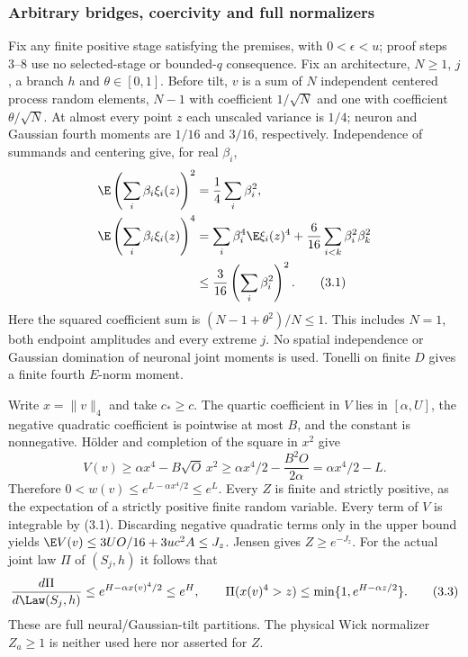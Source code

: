 \subsubsection{Arbitrary bridges, coercivity and full normalizers}
Fix any finite positive stage satisfying the premises, with $0<\epsilon<u$;
proof steps 3--8 use no selected-stage or bounded-$q$ consequence.
Fix an architecture, $N\ge1$, $j$, a branch $h$ and $\theta\in[0,1]$.
Before tilt, $v$ is a sum of $N$ independent centered process random
elements, $N-1$ with coefficient $1/\sqrt N$ and one with coefficient
$\theta/\sqrt N$. At almost every point $z$ each unscaled variance is
$1/4$; neuron and Gaussian fourth moments are $1/16$ and $3/16$,
respectively. Independence of summands and centering give, for real $\beta_i$,
\begin{align}
 \E\left(\sum_i\beta_i\xi_i(z)\right)^2&=\frac14\sum_i\beta_i^2,\notag\\
 \E\left(\sum_i\beta_i\xi_i(z)\right)^4
 &=\sum_i\beta_i^4\E\xi_i(z)^4
          +\frac6{16}\sum_{i<k}\beta_i^2\beta_k^2\notag\\
 &\le\frac3{16}\left(\sum_i\beta_i^2\right)^2.\tag{3.1}
\end{align}
Here the squared coefficient sum is $(N-1+\theta^2)/N\le1$.
This includes $N=1$, both endpoint amplitudes and every extreme $j$.
No spatial independence or Gaussian domination of neuronal joint moments
is used. Tonelli on finite $D$ gives a finite fourth $E$-norm moment.

Write $x=\|v\|_4$ and take $c_*\ge c$. The quartic coefficient in $V$
lies in $[\alpha,U]$, the negative quadratic coefficient is pointwise at
most $B$, and the constant is nonnegative. H\"older and completion of the
square in $x^2$ give
\begin{equation}
 V(v)\ge\alpha x^4-B\sqrt O\,x^2
       \ge\alpha x^4/2-\frac{B^2O}{2\alpha}
       =\alpha x^4/2-L.\tag{3.2}
\end{equation}
Therefore $0<w(v)\le e^{L-\alpha x^4/2}\le e^L$.
Every $Z$ is finite and strictly positive, as the expectation of a strictly
positive finite random variable. Every term of $V$ is integrable by (3.1).
Discarding negative quadratic terms only in the upper bound yields
$\E V(v)\le3UO/16+3uc^2A\le J_z$. Jensen gives $Z\ge e^{-J_z}$.
For the actual joint law $\Pi$ of $(S_j,h)$ it follows that
\begin{equation}
 \frac{d\Pi}{d\Law(S_j,h)}\le e^{H-\alpha x(v)^4/2}\le e^H,
 \qquad\Pi(x(v)^4>z)\le\min\{1,e^{H-\alpha z/2}\}.\tag{3.3}
\end{equation}
These are full neural/Gaussian-tilt partitions. The physical Wick
normalizer $Z_a\ge1$ is neither used here nor asserted for $Z$.

